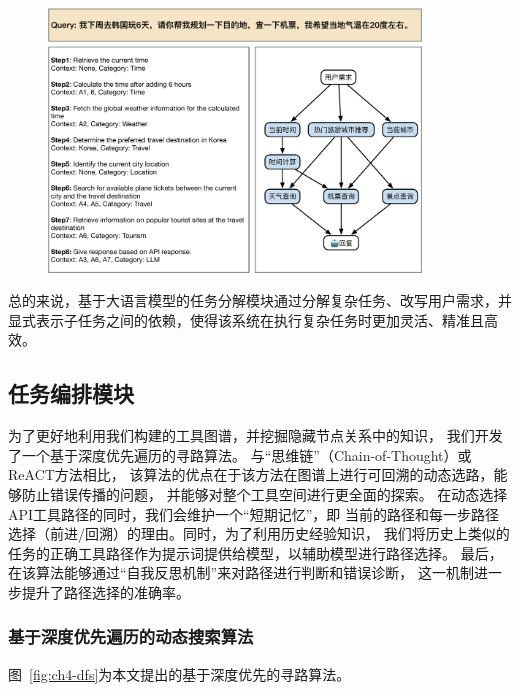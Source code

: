 \begin{figure}[!htp]
  \vspace{1em}
  \centering
  \setlength{\abovecaptionskip}{10pt} %
  \includegraphics[height=7cm]{../assets/ch4-任务分解模块.pdf}
  \label{fig:ch4-decomposition}
\end{figure}

总的来说，基于大语言模型的任务分解模块通过分解复杂任务、改写用户需求，并显式表示子任务之间的依赖，使得该系统在执行复杂任务时更加灵活、精准且高效。

\subsection{任务编排模块}

为了更好地利用我们构建的工具图谱，并挖掘隐藏节点关系中的知识，
我们开发了一个基于深度优先遍历的寻路算法。
与“思维链”（Chain-of-Thought）或ReACT方法相比，
该算法的优点在于该方法在图谱上进行可回溯的动态选路，能够防止错误传播的问题，
并能够对整个工具空间进行更全面的探索。
在动态选择API工具路径的同时，我们会维护一个“短期记忆”，即
当前的路径和每一步路径选择（前进/回溯）的理由。同时，为了利用历史经验知识，
我们将历史上类似的任务的正确工具路径作为提示词提供给模型，以辅助模型进行路径选择。
最后，在该算法能够通过“自我反思机制”来对路径进行判断和错误诊断，
这一机制进一步提升了路径选择的准确率。

\subsubsection{基于深度优先遍历的动态搜索算法}

图~\ref{fig:ch4-dfs}为本文提出的基于深度优先的寻路算法。

